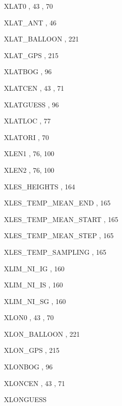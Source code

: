 \begin{theindex}
  \item XLAT0
    \subitem {},  43
    \subitem {},  70
  \item XLAT\_ANT
    \subitem {},  46
  \item XLAT\_BALLOON
    \subitem {},  221
  \item XLAT\_GPS
    \subitem {},  215
  \item XLATBOG
    \subitem {},  96
  \item XLATCEN
    \subitem {},  43
    \subitem {},  71
  \item XLATGUESS
    \subitem {},  96
  \item XLATLOC
    \subitem {},  77
  \item XLATORI
    \subitem {},  70
  \item XLEN1
    \subitem {},  76, 100
  \item XLEN2
    \subitem {},  76, 100
  \item XLES\_HEIGHTS
    \subitem {},  164
  \item XLES\_TEMP\_MEAN\_END
    \subitem {},  165
  \item XLES\_TEMP\_MEAN\_START
    \subitem {},  165
  \item XLES\_TEMP\_MEAN\_STEP
    \subitem {},  165
  \item XLES\_TEMP\_SAMPLING
    \subitem {},  165
  \item XLIM\_NI\_IG
    \subitem {},  160
  \item XLIM\_NI\_IS
    \subitem {},  160
  \item XLIM\_NI\_SG
    \subitem {},  160
  \item XLON0
    \subitem {},  43
    \subitem {},  70
  \item XLON\_BALLOON
    \subitem {},  221
  \item XLON\_GPS
    \subitem {},  215
  \item XLONBOG
    \subitem {},  96
  \item XLONCEN
    \subitem {},  43
    \subitem {},  71
  \item XLONGUESS

\end{theindex}
